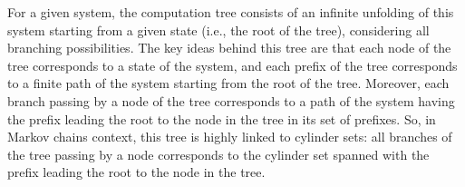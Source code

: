 For a given system, the computation tree consists of an infinite unfolding of this system starting from a given state (i.e., the root of the tree), considering
all branching possibilities.
The key ideas behind this tree are that
each node of the tree corresponds to a state of the system, and
each prefix of the tree corresponds to a finite path of the system starting from the root of the tree.
Moreover, each branch passing by a node of the tree corresponds to a path of the system having the prefix leading the root to the node in the tree in its set of prefixes.
So, in Markov chains context, this tree is highly linked to cylinder sets:  %
all branches of the tree passing by a node corresponds to the cylinder set spanned with the prefix leading the root to the node in the tree.

